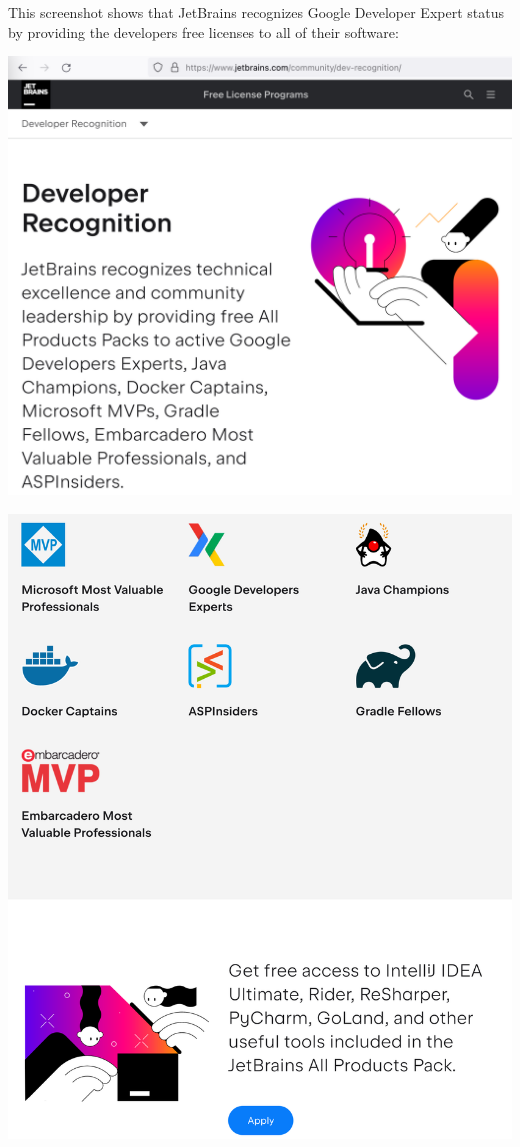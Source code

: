 
This screenshot shows that JetBrains recognizes
Google Developer Expert status by providing the developers
free licenses to all of their software:

\includegraphics[width=\textwidth]{jetbrains-recognizes-p1}
\WillContinue

\pagebreak

\Continuing
\includegraphics[width=\textwidth]{jetbrains-recognizes-p2}

